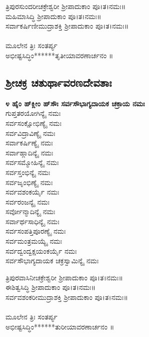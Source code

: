   ತ್ರಿಪುರಸುಂದರೀಚಕ್ರೇಶ್ವರೀ ಶ್ರೀಪಾದುಕಾಂ ಪೂ।ತ।ನಮಃ॥\\
 ಮಹಿಮಾಸಿದ್ಧಿ ಶ್ರೀಪಾದುಕಾಂ ಪೂ।ತ।ನಮಃ॥\\
 ಸರ್ವಾಕರ್ಷಿಣೀಮುದ್ರಾಶಕ್ತಿ ಶ್ರೀಪಾದುಕಾಂ ಪೂ।ತ।ನಮಃ॥\\
\\
ಮೂಲೇನ ತ್ರಿಃ ಸಂತರ್ಪ್ಯ\\
 ಅಭೀಷ್ಟಸಿದ್ಧಿಂ******ತೃತೀಯಾವರಣಾರ್ಚನಂ ॥
\subsection{ಶ್ರೀಚಕ್ರ ಚತುರ್ಥಾವರಣದೇವತಾಃ}
{\bfseries ೪ ಹೈಂ ಹ್‌ಕ್ಲೀಂ ಹ್‌ಸೌಃ ಸರ್ವಸೌಭಾಗ್ಯದಾಯಕ ಚಕ್ರಾಯ ನಮಃ}\\
ಗುಪ್ತತರಯೋಗಿನ್ಯೈ ನಮಃ\\
 ಸರ್ವಸಂಕ್ಷೋಭಿಣ್ಯೈ ನಮಃ\\
 ಸರ್ವವಿದ್ರಾವಿಣ್ಯೈ ನಮಃ\\
 ಸರ್ವಾಕರ್ಷಿಣ್ಯೈ ನಮಃ\\
 ಸರ್ವಾಹ್ಲಾದಿನ್ಯೈ ನಮಃ\\
 ಸರ್ವಸಮ್ಮೋಹಿನ್ಯೈ ನಮಃ\\
 ಸರ್ವಸ್ತಂಭಿನ್ಯೈ ನಮಃ\\
 ಸರ್ವಜೃಂಭಿಣ್ಯೈ ನಮಃ\\
 ಸರ್ವವಶಂಕರ್ಯೈ ನಮಃ\\
 ಸರ್ವರಂಜನ್ಯೈ ನಮಃ\\
 ಸರ್ವೋನ್ಮಾದಿನ್ಯೈ ನಮಃ\\
 ಸರ್ವಾರ್ಥಸಾಧಿನ್ಯೈ ನಮಃ\\
 ಸರ್ವಸಂಪತ್ತಿಪೂರಣ್ಯೈ ನಮಃ\\
 ಸರ್ವಮಂತ್ರಮಯ್ಯೈ ನಮಃ\\
 ಸರ್ವದ್ವಂದ್ವಕ್ಷಯಂಕರ್ಯೈ ನಮಃ\\
ಸರ್ವಸೌಭಾಗ್ಯದಾಯಕ ಚಕ್ರಸ್ವಾಮಿನ್ಯೈ ನಮಃ

 ತ್ರಿಪುರವಾಸಿನೀಚಕ್ರೇಶ್ವರೀ ಶ್ರೀಪಾದುಕಾಂ ಪೂ।ತ।ನಮಃ॥\\
 ಈಶಿತ್ವಸಿದ್ಧಿ ಶ್ರೀಪಾದುಕಾಂ ಪೂ।ತ।ನಮಃ॥\\
 ಸರ್ವವಶಂಕರೀಮುದ್ರಾಶಕ್ತಿ ಶ್ರೀಪಾದುಕಾಂ ಪೂ।ತ।ನಮಃ॥\\
\\
ಮೂಲೇನ ತ್ರಿಃ ಸಂತರ್ಪ್ಯ\\
 ಅಭೀಷ್ಟಸಿದ್ಧಿಂ******ತುರೀಯಾವರಣಾರ್ಚನಂ ॥
